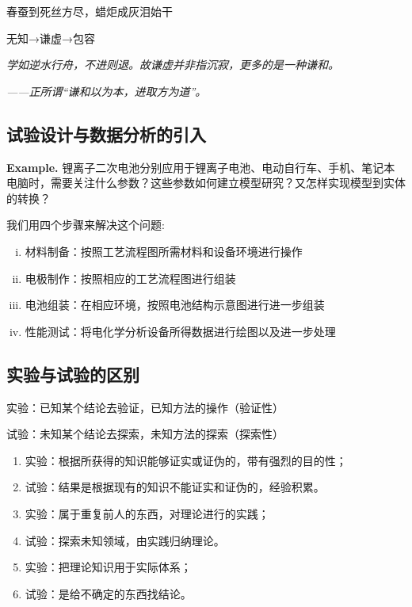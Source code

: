 \documentclass[UTF8]{ctexart}
\begin{document}
\begin{center}
\item 春蚕到死丝方尽，蜡炬成灰泪始干
\end{center}

\begin{center}
\item 无知→谦虚→包容
\end{center}

\emph{学如逆水行舟，不进则退。故谦虚并非指沉寂，更多的是一种谦和。}
\par \emph{——正所谓“谦和以为本，进取方为道”。}

\subsection{试验设计与数据分析的引入}
\textbf{Example.}
  锂离子二次电池分别应用于锂离子电池、电动自行车、手机、笔记本电脑时，需要关注什么参数？这些参数如何建立模型研究？又怎样实现模型到实体的转换？\\
\par 我们用四个步骤来解决这个问题:
\begin{enumerate}[(i)]
\item 材料制备：按照工艺流程图所需材料和设备环境进行操作
\item 电极制作：按照相应的工艺流程图进行组装
\item 电池组装：在相应环境，按照电池结构示意图进行进一步组装
\item 性能测试：将电化学分析设备所得数据进行绘图以及进一步处理
\end{enumerate}


\subsection{实验与试验的区别}
\begin{center}
\item 实验：已知某个结论去验证，已知方法的操作（验证性）
\item 试验：未知某个结论去探索，未知方法的探索（探索性）
\end{center}

\begin{enumerate}[•]
\item 实验：根据所获得的知识能够证实或证伪的，带有强烈的目的性；
\item 试验：结果是根据现有的知识不能证实和证伪的，经验积累。
\item 实验：属于重复前人的东西，对理论进行的实践；
\item 试验：探索未知领域，由实践归纳理论。
\item 实验：把理论知识用于实际体系；
\item 试验：是给不确定的东西找结论。
\end{enumerate}
\end{document}
